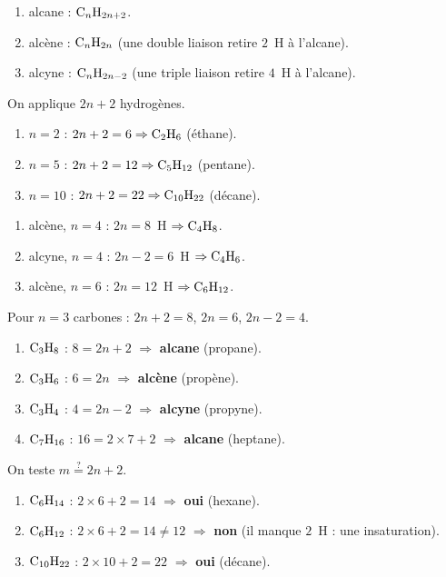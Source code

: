 \documentclass[11pt,a4paper]{article}
\begin{document}
\begin{corrige}
\begin{enumerate}[label=\alph*)]
  \item alcane : $\ce{C_nH_{2n+2}}$.
  \item alcène : $\ce{C_nH_{2n}}$ (une double liaison retire $2$~H à l'alcane).
  \item alcyne : $\ce{C_nH_{2n-2}}$ (une triple liaison retire $4$~H à l'alcane).
\end{enumerate}
\end{corrige}

\begin{corrige}
On applique $2n+2$ hydrogènes.
\begin{enumerate}[label=\alph*)]
  \item $n=2$ : $2n+2=6 \Rightarrow \ce{C2H6}$ (éthane).
  \item $n=5$ : $2n+2=12 \Rightarrow \ce{C5H12}$ (pentane).
  \item $n=10$ : $2n+2=22 \Rightarrow \ce{C10H22}$ (décane).
\end{enumerate}
\end{corrige}

\begin{corrige}
\begin{enumerate}[label=\alph*)]
  \item alcène, $n=4$ : $2n=8$~H $\Rightarrow \ce{C4H8}$.
  \item alcyne, $n=4$ : $2n-2=6$~H $\Rightarrow \ce{C4H6}$.
  \item alcène, $n=6$ : $2n=12$~H $\Rightarrow \ce{C6H12}$.
\end{enumerate}
\end{corrige}

\begin{corrige}
Pour $n=3$ carbones : $2n+2=8$, $2n=6$, $2n-2=4$.
\begin{enumerate}[label=\alph*)]
  \item $\ce{C3H8}$ : $8=2n+2$ $\Rightarrow$ \textbf{alcane} (propane).
  \item $\ce{C3H6}$ : $6=2n$ $\Rightarrow$ \textbf{alcène} (propène).
  \item $\ce{C3H4}$ : $4=2n-2$ $\Rightarrow$ \textbf{alcyne} (propyne).
  \item $\ce{C7H16}$ : $16=2\times7+2$ $\Rightarrow$ \textbf{alcane} (heptane).
\end{enumerate}
\end{corrige}

\begin{corrige}
On teste $m\overset{?}{=}2n+2$.
\begin{enumerate}[label=\alph*)]
  \item $\ce{C6H14}$ : $2\times6+2=14$ $\Rightarrow$ \textbf{oui} (hexane).
  \item $\ce{C6H12}$ : $2\times6+2=14\neq12$ $\Rightarrow$ \textbf{non} (il manque $2$~H : une insaturation).
  \item $\ce{C10H22}$ : $2\times10+2=22$ $\Rightarrow$ \textbf{oui} (décane).
\end{enumerate}
\end{corrige}
\end{document}
